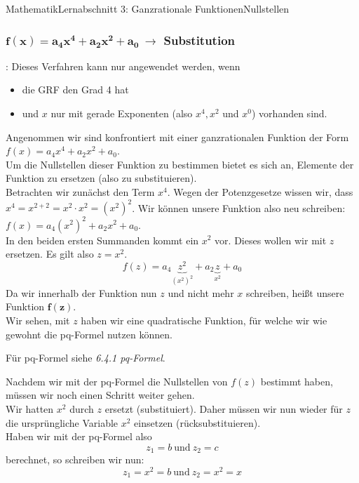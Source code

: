 \documentclass[11pt,twocolumn,oneside,openany,headings=optiontotoc,11pt,numbers=noenddot]{article}
\begin{document}
\begin{worksheet}{Mathematik}{Lernabschnitt 3: Ganzrationale Funktionen}{Nullstellen}
		\subsubsection{\(\mathbf{f(x) = a_4x^4 + a_2x^2 + a_0}\ \rightarrow\) Substitution}
		\begin{framed}
			\noindent
			\underline{\color{red}{Vorsicht!}}: Dieses Verfahren kann nur angewendet werden, wenn
			\begin{itemize}
				\item die GRF den Grad 4 hat
				\item und \(x\) nur mit gerade Exponenten (also \(x^4, x^2\) und \(x^0\)) vorhanden sind.
			\end{itemize}
		\end{framed}
		Angenommen wir sind konfrontiert mit einer ganzrationalen Funktion der Form \(f(x) = a_4x^4 + a_2x^2 + a_0\).\\
		Um die Nullstellen dieser Funktion zu bestimmen bietet es sich an, Elemente der Funktion \grq{}zu ersetzen\grq{} (also zu substituieren).\\
		Betrachten wir zunächst den Term \(x^4\). Wegen der Potenzgesetze wissen wir, dass \(x^4 = x^{2+2} = x^2\cdot{}x^2 = (x^2)^2\). Wir können unsere Funktion also neu schreiben: \(f(x) = a_4(x^2)^2 + a_2x^2 + a_0\).\\
		In den beiden ersten Summanden kommt ein \(x^2\) vor. Dieses wollen wir mit \(z\) ersetzen. Es gilt also \(z = x^2\).\\
		\[f(z) = a_4\underbrace{z^2}_{(x^2)^2} + a_2\underbrace{z}_{x^2} + a_0\]
		Da wir innerhalb der Funktion nun \(z\) und nicht mehr \(x\) schreiben, heißt unsere Funktion \(\mathbf{f(z)}\).\\
		Wir sehen, mit \(z\) haben wir eine quadratische Funktion, für welche wir wie gewohnt die pq-Formel nutzen können.\\
		\par\noindent
		\small{Für pq-Formel siehe \textit{6.4.1 pq-Formel}.}\normalsize\\
		\par\noindent
		Nachdem wir mit der pq-Formel die Nullstellen von \(f(z)\) bestimmt haben, müssen wir noch einen Schritt weiter gehen.\\
		Wir hatten \(x^2\) durch \(z\) ersetzt (substituiert). Daher müssen wir nun wieder für \(z\) die ursprüngliche Variable \(x^2\) einsetzen (rücksubstituieren).\\
		Haben wir mit der pq-Formel also \[z_1 = b\ \text{und}\ z_2 = c\] berechnet, so schreiben wir nun: \[z_1 = x^2 = b\ \text{und}\ z_2 = x^2 = x\]

\end{worksheet}
\end{document}
